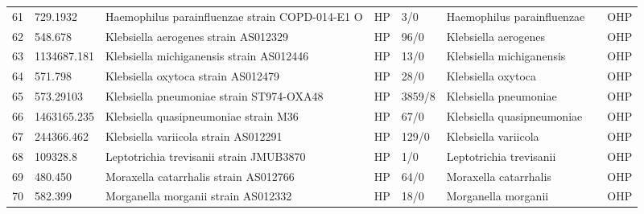 \begin{longtable}{llllllll}
61  &      729.1932 &                          Haemophilus parainfluenzae strain COPD-014-E1 O &    HP &       3/0 &                     Haemophilus parainfluenzae &                                         \cite{fluit2020draft} &   OHP \\
62  &       548.678 &                                     Klebsiella aerogenes strain AS012329 &    HP &      96/0 &                           Klebsiella aerogenes &                                  \cite{davin2015enterobacter} &   OHP \\
63  &   1134687.181 &                                 Klebsiella michiganensis strain AS012446 &    HP &      13/0 &                       Klebsiella michiganensis &                                     \cite{chapman2020genomic} &   OHP \\
64  &       571.798 &                                       Klebsiella oxytoca strain AS012479 &    HP &      28/0 &                             Klebsiella oxytoca &                                    \cite{singh2016klebsiella} &   OHP \\
65  &     573.29103 &                                 Klebsiella pneumoniae strain ST974-OXA48 &    HP &    3859/8 &                          Klebsiella pneumoniae &                                    \cite{singh2016klebsiella} &   OHP \\
66  &   1463165.235 &                                    Klebsiella quasipneumoniae strain M36 &    HP &      67/0 &                     Klebsiella quasipneumoniae &                                       \cite{imai2019clinical} &   OHP \\
67  &    244366.462 &                                     Klebsiella variicola strain AS012291 &    HP &     129/0 &                           Klebsiella variicola &                                       \cite{imai2019clinical} &   OHP \\
68  &      109328.8 &                                  Leptotrichia trevisanii strain JMUB3870 &    HP &       1/0 &                        Leptotrichia trevisanii &                                  \cite{eribe2017leptotrichia} &   OHP \\
69  &       480.450 &                                    Moraxella catarrhalis strain AS012766 &    HP &      64/0 &                          Moraxella catarrhalis &                                  \cite{blakeway2017virulence} &   OHP \\
70  &       582.399 &                                      Morganella morganii strain AS012332 &    HP &      18/0 &                            Morganella morganii &                                      \cite{liu2016morganella} &   OHP \\

\end{longtable}
